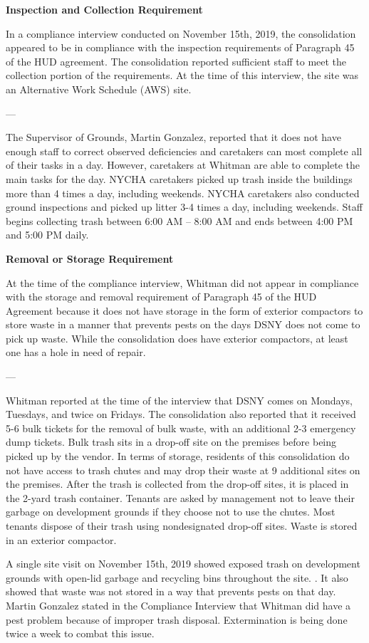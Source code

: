 
\textbf{Inspection and Collection Requirement}

In a compliance interview conducted on November 15th, 2019, the consolidation appeared to be in compliance with the inspection requirements of Paragraph 45 of the HUD agreement. The consolidation reported sufficient staff to meet the collection portion of the requirements. At the time of this interview, the site was an Alternative Work Schedule (AWS) site. 

---

The Supervisor of Grounds, Martin Gonzalez, reported that it does not have enough staff to correct observed deficiencies and caretakers can most complete all of their tasks in a day. However, caretakers at Whitman are able to complete the main tasks for the day. NYCHA caretakers picked up trash inside the buildings more than 4 times a day, including weekends. NYCHA caretakers also conducted ground inspections and picked up litter 3-4 times a day, including weekends. Staff begins collecting trash between 6:00 AM -- 8:00 AM and ends between 4:00 PM and 5:00 PM daily.

\textbf{Removal or Storage Requirement}

At the time of the compliance interview, Whitman did not appear in compliance with the storage and removal requirement of Paragraph 45 of the HUD Agreement because it does not have storage in the form of exterior compactors to store waste in a manner that prevents pests on the days DSNY does not come to pick up waste. While the consolidation does have exterior compactors, at least one has a hole in need of repair. 

---

Whitman reported at the time of the interview that DSNY comes on Mondays, Tuesdays, and twice on Fridays. The consolidation also reported that it received 5-6 bulk tickets for the removal of bulk waste, with an additional 2-3 emergency dump tickets. Bulk trash sits in a drop-off site on the premises before being picked up by the vendor. In terms of storage, residents of this consolidation do not have access to trash chutes and may drop their waste at 9 additional sites on the premises. After the trash is collected from the drop-off sites, it is placed in the 2-yard trash container. Tenants are asked by management not to leave their garbage on development grounds if they choose not to use the chutes. Most tenants dispose of their trash using nondesignated drop-off sites. Waste is stored in an exterior compactor. 

A single site visit on November 15th, 2019 showed exposed trash on development grounds with open-lid garbage and recycling bins throughout the site. . It also showed that waste was not stored in a way that prevents pests on that day. Martin Gonzalez stated in the Compliance Interview that Whitman did have a pest problem because of improper trash disposal. Extermination is being done twice a week to combat this issue.

